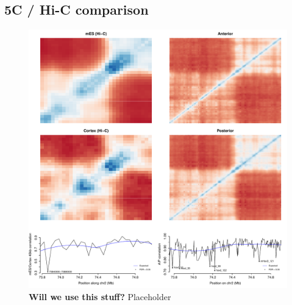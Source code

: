 \documentclass[a4paper,11pt,oneside]{book}
\begin{document}
\subsection{5C / Hi-C comparison}


\begin{figure}
\begin{center} 
\includegraphics[width=\textwidth]{figs/5chic.pdf}
\captionsetup{width=\textwidth} 
\caption{ {\bf Will we use this stuff? }
Placeholder
}\label{fig:5cdiff}
\end{center} 
\end{figure} 


\ifstandalone
\begin{small}

\end{small}
\fi
\end{document}
